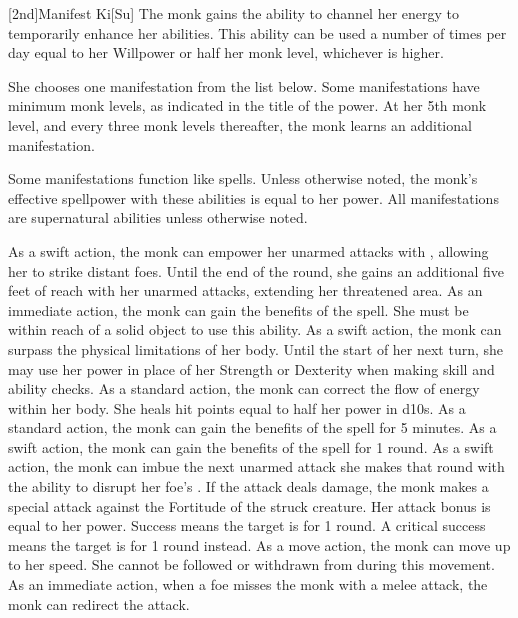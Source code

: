 [2nd]{Manifest Ki}[Su]
The monk gains the ability to channel her \ki energy to temporarily enhance her abilities.
This ability can be used a number of times per day equal to her Willpower or half her monk level, whichever is higher.

She chooses one \ki manifestation from the list below.
Some \ki manifestations have minimum monk levels, as indicated in the title of the power.
At her 5th monk level, and every three monk levels thereafter, the monk learns an additional \ki manifestation.

Some \ki manifestations function like spells.
Unless otherwise noted, the monk's effective spellpower with these abilities is equal to her \ki power.
All \ki manifestations are supernatural abilities unless otherwise noted.

As a swift action, the monk can empower her unarmed attacks with \ki, allowing her to strike distant foes.
Until the end of the round, she gains an additional five feet of reach with her unarmed attacks, extending her threatened area.
As an immediate action, the monk can gain the benefits of the  spell.
She must be within reach of a solid object to use this ability.
As a swift action, the monk can surpass the physical limitations of her body.
Until the start of her next turn, she may use her \ki power in place of her Strength or Dexterity when making skill and ability checks.
As a standard action, the monk can correct the flow of energy within her body.
She heals hit points equal to half her \ki power in d10s.
As a standard action, the monk can gain the benefits of the  spell for 5 minutes.
As a swift action, the monk can gain the benefits of the  spell for 1 round.
As a swift action, the monk can imbue the next unarmed attack she makes that round with the ability to disrupt her foe's \ki.
If the attack deals damage, the monk makes a special attack against the Fortitude of the struck creature.
Her attack bonus is equal to her \ki power.
Success means the target is \staggered for 1 round.
A critical success means the target is \stunned for 1 round instead.
\norepeatnotes
{}
As a move action, the monk can move up to her speed.
She cannot be followed or withdrawn from during this movement.
As an immediate action, when a foe misses the monk with a melee attack, the monk can redirect the attack.
